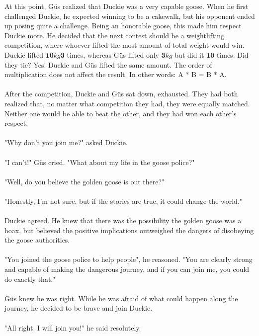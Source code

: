{}
{At this point, Güs realized that Duckie was a very capable goose. When he first challenged Duckie, he expected winning to be a cakewalk, but his opponent ended up posing quite a challenge. Being an honorable goose, this made him respect Duckie more. He decided that the next contest should be a weightlifting competition, where whoever lifted the most amount of total weight would win. Duckie lifted $\mathbf{10} kg  \mathbf{3}$ times, whereas Güs lifted only $\mathbf{3} kg$ but did it $\mathbf{10}$ times. Did they tie?}
{Yes! Duckie and Güs lifted the same amount.}
{The order of multiplication does not affect the result. In other words: A * B = B * A.}
{}
\paragraph{} After the competition, Duckie and Güs sat down, exhausted. They had both realized that, no matter what competition they had, they were equally matched. Neither one would be able to beat the other, and they had won each other's respect. 
\paragraph{} "Why don't you join me?" asked Duckie.
\paragraph{} "I can't!" Güs cried. "What about my life in the goose police?"
\paragraph{} "Well, do you believe the golden goose is out there?"
\paragraph{} "Honestly, I'm not sure, but if the stories are true, it could change the world."
\paragraph{} Duckie agreed. He knew that there was the possibility the golden goose was a hoax, but believed the positive implications outweighed the dangers of disobeying the goose authorities. 
\paragraph{} "You joined the goose police to help people", he reasoned. "You are clearly strong and capable of making the dangerous journey, and if you can join me, you could do exactly that."
\paragraph{} Güs knew he was right. While he was afraid of what could happen along the journey, he decided to be brave and join Duckie. 
\paragraph{} "All right. I will join you!" he said resolutely. 